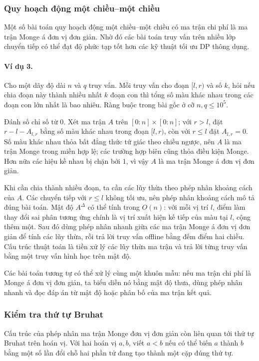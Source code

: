\documentclass[11pt]{article}
\begin{document}
\subsubsection{Quy hoạch động một chiều--một chiều}

Một số bài toán quy hoạch động một chiều--một chiều có ma trận chi phí là ma
trận Monge á đơn vị đơn giản. Nhờ đó các bài toán truy vấn trên nhiều lớp chuyển
tiếp có thể đạt độ phức tạp tốt hơn các kỹ thuật tối ưu DP thông dụng.

\paragraph{Ví dụ 3.}
Cho một dãy độ dài $n$ và $q$ truy vấn. Mỗi truy vấn cho đoạn $[l,r)$ và số
$k$, hỏi nếu chia đoạn này thành nhiều nhất $k$ đoạn con thì tổng số màu khác
nhau trong các đoạn con lớn nhất là bao nhiêu. Ràng buộc trong bài gốc ở cỡ
$n,q\le 10^5$.

Đánh số chỉ số từ $0$. Xét ma trận $A$ trên $[0:n]\times[0:n]$; với $r>l$, đặt
$r-l-A_{l,r}$ bằng số màu khác nhau trong đoạn $[l,r)$, còn với $r\le l$ đặt
$A_{l,r}=0$. Số màu khác nhau thỏa bất đẳng thức tứ giác theo chiều ngược, nên
$A$ là ma trận Monge trong miền hợp lệ; các trường hợp biên cũng thỏa điều kiện
Monge. Hơn nữa các hiệu kề nhau bị chặn bởi $1$, vì vậy $A$ là ma trận Monge á
đơn vị đơn giản.

Khi cần chia thành nhiều đoạn, ta cần các lũy thừa theo phép nhân khoảng cách
của $A$. Các chuyển tiếp với $r\le l$ không tối ưu, nên phép nhân khoảng cách mô
tả đúng bài toán. Mật độ $A^{\Delta}$ có thể tính trong $O(n)$: với mỗi vị trí
$l$, điểm làm thay đổi sai phân tương ứng chính là vị trí xuất hiện kế tiếp của
màu tại $l$, cộng thêm một. Sau đó dùng phép nhân nhanh giữa các ma trận Monge á
đơn vị đơn giản để tính các lũy thừa, rồi trả lời truy vấn offline bằng đếm điểm
hai chiều. Cấu trúc thuật toán là tiền xử lý các lũy thừa ma trận và trả lời
từng truy vấn bằng một truy vấn hình học trên mật độ.

Các bài toán tương tự có thể xử lý cùng một khuôn mẫu: nếu ma trận chi phí là
Monge á đơn vị đơn giản, ta biểu diễn nó bằng mật độ thưa, dùng phép nhân nhanh
và đọc đáp án từ mật độ hoặc phân bố của ma trận kết quả.

\subsubsection{Kiểm tra thứ tự Bruhat}

Cấu trúc của phép nhân ma trận Monge đơn vị đơn giản còn liên quan tới thứ tự
Bruhat trên hoán vị. Với hai hoán vị $a,b$, viết $a<b$ nếu có thể biến $a$ thành
$b$ bằng một số lần đổi chỗ hai phần tử đang tạo thành một cặp đúng thứ tự.
\end{document}
